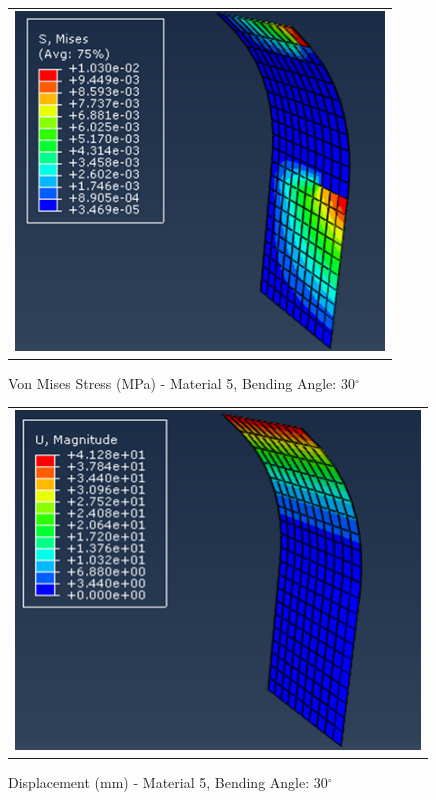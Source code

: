 \documentclass[a4paper,12pt]{article}
\numberwithin{equation}{section}
\numberwithin{figure}{section}
\begin{document}
\begin{figure}[H]
  \centering
  \begin{tabular}{@{}c@{}}
    \includegraphics[width=0.7\linewidth,height=255pt]{Results/Bending/M5_VMS_30.png} \\
  \end{tabular}
  \caption{Von Mises Stress (MPa) - Material 5,  Bending Angle: 30$^{\circ}$ }
\end{figure}

\begin{figure}[H]
  \centering
  \begin{tabular}{@{}c@{}}
    \includegraphics[width=0.7\linewidth,height=255pt]{Results/Bending/M5_DIS_30.png} \\
  \end{tabular}
  \caption{Displacement (mm) - Material 5, Bending Angle: 30$^{\circ}$ }
\end{figure}
\end{document}
